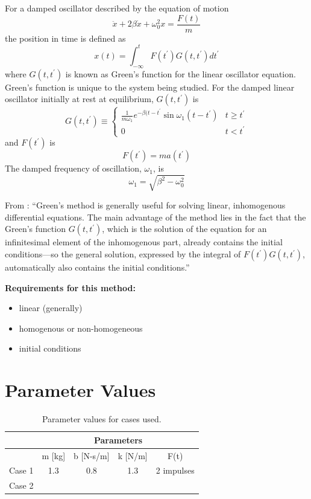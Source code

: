 \documentclass[10pt,letterpaper]{article}
\begin{document}
For a damped oscillator described by the equation of motion
\begin{equation}
	\ddot{x} + 2\beta\dot{x} + \omega_0^2 x = \frac{F(t)}{m}
\end{equation}
the position in time is defined as
\begin{equation}
	x(t) = \int_{-\infty}^t F(t^{\prime})G(t,t^{\prime})dt^{\prime}
\end{equation}
where $G(t,t^{\prime})$ is known as Green's function for the linear oscillator equation.
Green's function is unique to the system being studied.
For the damped linear oscillator initially at rest at equilibrium, $G(t,t^{\prime})$ is
\begin{equation}
	G(t,t^{\prime}) \equiv 
\begin{cases}
	\frac{1}{m\omega_1}e^{-\beta(t-t^{\prime}}\sin \omega_1(t-t^{\prime}) & t \geq t^{\prime} \\
	0 & t < t^{\prime}
\end{cases}
\end{equation}
and $F(t^{\prime})$ is 
\begin{equation}
	F(t^{\prime}) = ma(t^{\prime})
\end{equation}
The damped frequency of oscillation, $\omega_1$, is
\begin{equation}
	\omega_1 = \sqrt{\beta^2 - \omega_0^2}
\end{equation}

From \citet{marion95.1}: ``Green's method is generally useful for solving linear, inhomogenous differential equations.
The main advantage of the method lies in the fact that the Green's function $G(t,t^{\prime})$, which is the solution of the equation for an infinitesimal element of the inhomogenous part, already contains the initial conditions---so the general solution, expressed by the integral of $F(t^{\prime})G(t,t^{\prime})$, automatically also contains the initial conditions.''

\textbf{Requirements for this method:}
\begin{itemize}
	\item linear (generally)
	\item homogenous or non-homogeneous
	\item initial conditions
\end{itemize}

\section{Parameter Values}
\begin{table}[H]
\centering
\caption{Parameter values for cases used.}
\label{tab:parameters}
\begin{tabular}{ccccc}
       & \multicolumn{4}{c}{Parameters}                        \\ \hline
       & m {[}kg{]} & b {[}N-s/m{]} & k {[}N/m{]} & F(t)       \\ \hline
Case 1 & 1.3        & 0.8           & 1.3         & 2 impulses \\ \hline
Case 2 &            &               &             &           \\ \hline
\end{tabular}
\end{table}


\end{document}
